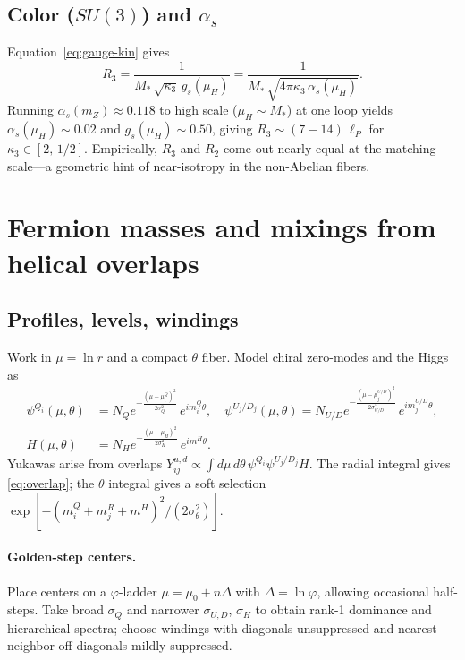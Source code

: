 \documentclass[11pt]{article}
\begin{document}
\subsection{Color (\(SU(3)\)) and \(\alpha_s\)}
Equation~\eqref{eq:gauge-kin} gives
\begin{equation}
R_3=\frac{1}{M_*\,\sqrt{\kappa_3}\,g_s(\mu_H)}=\frac{1}{M_*\,\sqrt{4\pi\kappa_3\,\alpha_s(\mu_H)}}.
\end{equation}
Running \(\alpha_s(m_Z)\approx 0.118\) to high scale (\(\mu_H\sim M_*\)) at one loop yields \(\alpha_s(\mu_H)\sim 0.02\) and \(g_s(\mu_H)\sim 0.50\), giving \(R_3\sim (7\!-\!14)\,\ell_P\) for \(\kappa_3\in[2,\,1/2]\).
Empirically, \(R_3\) and \(R_2\) come out nearly equal at the matching scale---a geometric hint of near-isotropy in the non-Abelian fibers.

\section{Fermion masses and mixings from helical overlaps}\label{sec:yuk}
\subsection{Profiles, levels, windings}
Work in \(\mu=\ln r\) and a compact \(\theta\) fiber. Model chiral zero-modes and the Higgs as
\begin{align}
\psi^{Q_i}(\mu,\theta)&=N_Q e^{-\frac{(\mu-\mu_i^Q)^2}{2\sigma_Q^2}}\,e^{i m_i^Q\theta},\quad
\psi^{U_j/D_j}(\mu,\theta)=N_{U/D} e^{-\frac{(\mu-\mu_j^{U/D})^2}{2\sigma_{U/D}^2}}\,e^{i m_j^{U/D}\theta},\\
H(\mu,\theta)&=N_H e^{-\frac{(\mu-\mu_H)^2}{2\sigma_H^2}}\,e^{i m^H\theta}.
\end{align}
Yukawas arise from overlaps \(Y^{u,d}_{ij}\propto \int d\mu\,d\theta\, \psi^{Q_i}\psi^{U_j/D_j}H\). The radial integral gives \eqref{eq:overlap}; the \(\theta\) integral gives a soft selection \(\exp[-(m_i^Q+m_j^{R}+m^H)^2/(2\sigma_\theta^2)]\).

\paragraph{Golden-step centers.} Place centers on a \(\varphi\)-ladder \(\mu=\mu_0+n\Delta\) with \(\Delta=\ln\varphi\), allowing occasional half-steps. Take broad \(\sigma_Q\) and narrower \(\sigma_{U,D}\), \(\sigma_H\) to obtain rank-1 dominance and hierarchical spectra; choose windings with diagonals unsuppressed and nearest-neighbor off-diagonals mildly suppressed.
\end{document}
